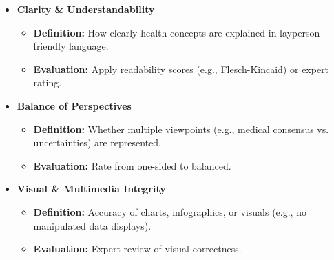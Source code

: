 \documentclass[]{article}
\begin{document}
\begin{itemize}
\item
  \textbf{Clarity \& Understandability}

  \begin{itemize}
  \item
    \textbf{Definition:} How clearly health concepts are explained in layperson-friendly language.
  \item
    \textbf{Evaluation:} Apply readability scores (e.g., Flesch-Kincaid) or expert rating.
  \end{itemize}
\item
  \textbf{Balance of Perspectives}

  \begin{itemize}
  \item
    \textbf{Definition:} Whether multiple viewpoints (e.g., medical
    consensus vs. uncertainties) are represented.
  \item
    \textbf{Evaluation:} Rate from one-sided to balanced.
  \end{itemize}
\item
  \textbf{Visual \& Multimedia Integrity}

  \begin{itemize}
  \item
    \textbf{Definition:} Accuracy of charts, infographics, or visuals
    (e.g., no manipulated data displays).
    \item
  \textbf{Evaluation:} Expert review of visual correctness.
  \end{itemize}

\end{itemize}
\end{document}
